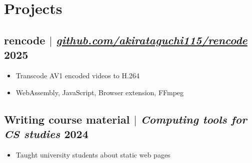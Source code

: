 \documentclass[11pt]{article} %
\begin{document}
\section{Projects}
\subsection{rencode $|$ \normalfont \textit{\href{https://github.com/akirataguchi115/rencode}{github.com/akirataguchi115/rencode}} \hfill 2025}
\begin{itemize}
  \item Transcode AV1 encoded videos to H.264
  \item WebAssembly, JavaScript, Browser extension, FFmpeg
\end{itemize}

\subsection{Writing course material $|$ \normalfont \textit{Computing tools for CS studies} \hfill 2024}
\begin{itemize}
  \item Taught university students about static web pages
\end{itemize}
\end{document}
